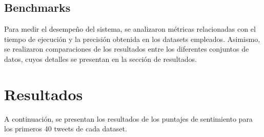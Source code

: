 \documentclass[sigconf, review=false, nonacm]{acmart}
\begin{document}
\subsection{Benchmarks}
Para medir el desempeño del sistema, se analizaron métricas relacionadas
con el tiempo de ejecución y la precisión obtenida en los datasets empleados.
Asimismo, se realizaron comparaciones de los resultados entre los diferentes conjuntos de datos,
cuyos detalles se presentan en la sección de resultados.

\section{Resultados}
A continuación, se presentan los resultados de los puntajes de sentimiento para los primeros
40 tweets de cada dataset.
\end{document}
